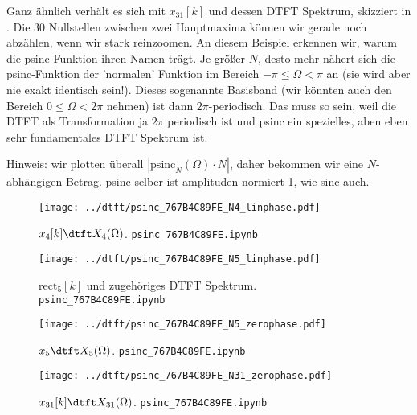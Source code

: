 \begin{Loesung}
Ganz ähnlich verhält es sich mit $x_{31}[k]$ und dessen DTFT Spektrum, skizziert
in . Die 30 Nullstellen zwischen
zwei Hauptmaxima können wir gerade noch abzählen, wenn wir stark reinzoomen.
An diesem Beispiel erkennen wir, warum die psinc-Funktion ihren Namen trägt.
Je größer $N$, desto mehr nähert sich die psinc-Funktion der 'normalen'
Funktion im Bereich $-\pi\leq\Omega<\pi$ an (sie wird aber nie exakt identisch sein!).
Dieses sogenannte Basisband (wir könnten auch den Bereich $0\leq\Omega<2\pi$ nehmen)
ist dann $2\pi$-periodisch. Das muss so sein, weil die DTFT als Transformation
ja $2\pi$ periodisch ist und psinc ein spezielles, aben eben sehr fundamentales DTFT
Spektrum ist.

Hinweis: wir plotten überall $|\mathrm{psinc}_N(\Omega)\cdot N|$, daher bekommen wir
eine $N$-abhängigen Betrag. psinc selber ist amplituden-normiert 1, wie sinc auch.

\end{Loesung}
%
\begin{figure}
\centering
\texttt{[image: ../dtft/psinc\_767B4C89FE\_N4\_linphase.pdf]}
\caption{$x_4[k]\dtft X_4(\Omega)$.
\texttt{psinc\_767B4C89FE.ipynb}}
\label{fig:psinc_767B4C89FE_N4_linphase}
\end{figure}
%
\begin{figure}
\centering
\texttt{[image: ../dtft/psinc\_767B4C89FE\_N5\_linphase.pdf]}
\caption{$\mathrm{rect}_5[k]$ und zugehöriges DTFT Spektrum.
\texttt{psinc\_767B4C89FE.ipynb}}
\label{fig:psinc_767B4C89FE_N5_linphase}
\end{figure}
%
\begin{figure}
\centering
\texttt{[image: ../dtft/psinc\_767B4C89FE\_N5\_zerophase.pdf]}
\caption{$x_5 \dtft X_5(\Omega)$.
\texttt{psinc\_767B4C89FE.ipynb}}
\label{fig:psinc_767B4C89FE_N5_zerophase}
\end{figure}
%
\begin{figure}
\centering
\texttt{[image: ../dtft/psinc\_767B4C89FE\_N31\_zerophase.pdf]}
\caption{$x_{31}[k]\dtft X_{31}(\Omega)$.
\texttt{psinc\_767B4C89FE.ipynb}}
\label{fig:psinc_767B4C89FE_N31_zerophase}
\end{figure}




\clearpage
